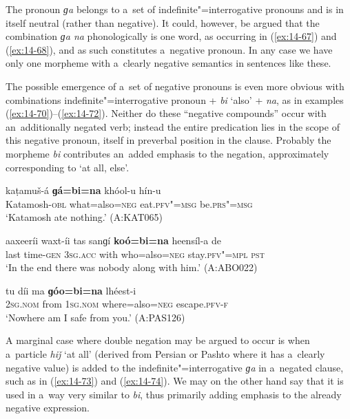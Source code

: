 The pronoun \textit{ɡa} belongs to a~set of indefinite"=interrogative pronouns and is in itself neutral (rather than negative). It could, however, be argued that the combination \textit{ɡa na} phonologically is one word, as occurring in (\ref{ex:14-67}) and (\ref{ex:14-68}), and as such constitutes a~negative pronoun. In any case we have only one morpheme with a~clearly negative semantics in sentences like these. 



The possible emergence of a~set of negative pronouns is even more obvious with combinations indefinite"=interrogative pronoun + \textit{bi} `also' + \textit{na}, as in examples (\ref{ex:14-70})--(\ref{ex:14-72}). Neither do these ``negative compounds'' occur with an~additionally negated verb; instead the entire predication lies in the scope of this negative pronoun, itself in preverbal position in the clause. Probably the morpheme \textit{bi} contributes an~added emphasis to the negation, approximately corresponding to `at all, else'.

\begin{exe}
\ex
\label{ex:14-70}
\gll kaṭamuš-á \textbf{ɡá=bi=na} khóol-u hín-u \\
Katamosh-\textsc{obl} what=also=\textsc{neg} eat.\textsc{pfv"=msg } be.\textsc{prs"=msg} \\
\glt `Katamosh ate nothing.' (A:KAT065)

\ex
\label{ex:14-71}
\gll aaxeeríi waxt-íi tas sanɡí \textbf{koó=bi=na} heensíl-a  de \\
last time-\textsc{gen} \textsc{3sg.acc} with who=also=\textsc{neg} stay.\textsc{pfv"=mpl}  \textsc{pst} \\
\glt `In the end there was nobody along with him.' (A:ABO022)

\ex
\label{ex:14-72}
\gll tu díi ma \textbf{ɡóo=bi=na} lhéest-i \\
\textsc{2sg.nom} from \textsc{1sg.nom} where=also=\textsc{neg} escape.\textsc{pfv-f}  \\
\glt `Nowhere am I safe from you.' (A:PAS126)
\end{exe}

A marginal case where double negation may be argued to occur is when a~particle \textit{hiǰ} `at all' (derived from Persian or Pashto where it has a~clearly negative value) is added to the indefinite"=interrogative \textit{ɡa} in a~negated clause, such as in (\ref{ex:14-73}) and (\ref{ex:14-74}). We may on the other hand say that it is used in a~way very similar to \textit{bi}, thus primarily adding emphasis to the already negative expression.

